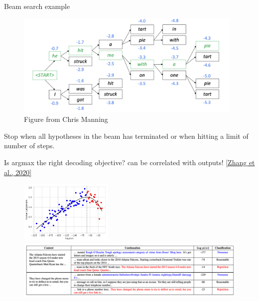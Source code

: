 \documentclass[usenames,dvipsnames,notes,11pt,aspectratio=169,hyperref={colorlinks=true, linkcolor=blue}]{beamer}
\begin{document}
\begin{frame}
    {Beam search example}
    \begin{figure}
        \includegraphics[height=5cm]{figures/beam-search}
        \caption{Figure from Chris Manning}
    \end{figure}

    \pause
    Stop when all hypotheses in the beam has terminated or when hitting a limit of number of steps.
\end{frame}

\begin{frame}
    {Is argmax the right decoding objective?}
     can be correlated with  outputs! \href{https://arxiv.org/abs/2004.10450}{[Zhang et al., 2020]}
    \begin{figure}
        \includegraphics[height=3cm]{figures/likelihood-trap}\\
        \includegraphics[width=\textwidth]{figures/likelihood-trap-ex}
    \end{figure}
\end{frame}
\end{document}
